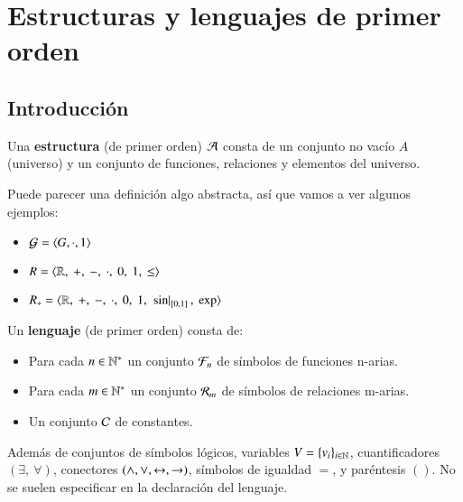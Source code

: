 
\chapter{Estructuras y lenguajes de primer orden}
\section{Introducción}
\begin{dfn}[Estructura]\label{dfn:estructura}
    Una \textbf{estructura} (de primer orden) $\mathcal{A}$ consta de un conjunto no vacío $A$ (universo) y un conjunto de funciones, relaciones y elementos del universo.
\end{dfn}
Puede parecer una definición algo abstracta, así que vamos a ver algunos ejemplos:
\begin{eg}
    \begin{itemize}
        \item $ \mathcal{G} = \langle G, \cdot, 1\rangle $
        \item $ R = \langle\mathbb{R},\  +,\  -,\  \cdot,\  0,\  1,\  \leq\rangle $
        \item $ R_* = \langle\mathbb{R},\  +,\  -,\  \cdot,\  0,\  1,\ \left. \sin \right|_{[0, 1]},\  \exp\rangle$
    \end{itemize}
\end{eg}

\begin{dfn}[Lenguaje]\label{dfn:lenguaje}
    Un \textbf{lenguaje} (de primer orden) consta de:\\
    \begin{itemize}
        \item Para cada $n \in \mathbb{N}^*$ un conjunto $\mathcal{F}_n$ de símbolos de funciones n-arias.
        \item Para cada $m \in \mathbb{N}^*$ un conjunto $\mathcal{R}_m$ de símbolos de relaciones m-arias.
        \item Un conjunto $\mathcal{C}$ de constantes.
    \end{itemize}
    Además de conjuntos de símbolos lógicos, variables $V = \{v_i\}_{i\in \mathbb{N}}$, cuantificadores $(\exists,\ \forall)$, conectores $(\land, \lor, \leftrightarrow, \rightarrow)$, símbolos de igualdad $=$, y paréntesis $()$. No se suelen especificar en la declaración del lenguaje.
\end{dfn}


